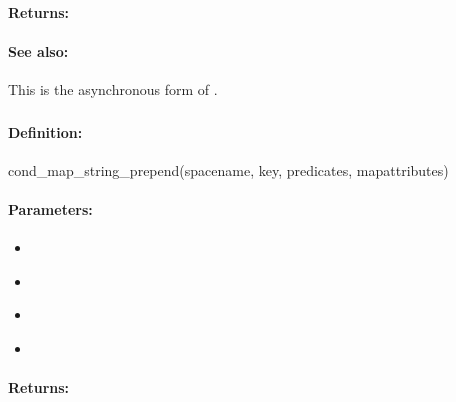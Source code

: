 \paragraph{Returns:}


\paragraph{See also:}  This is the asynchronous form of .

\pagebreak
\subsubsection{}
\label{api:ruby:cond_map_string_prepend}


\paragraph{Definition:}
\begin{rubycode}
cond_map_string_prepend(spacename, key, predicates, mapattributes)
\end{rubycode}

\paragraph{Parameters:}
\begin{itemize}[noitemsep]
\item {}\\

\item {}\\

\item {}\\

\item {}\\

\end{itemize}

\paragraph{Returns:}


